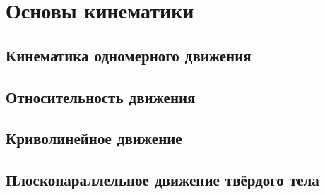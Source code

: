 \chapter{Основы кинематики}

\section{Кинематика одномерного движения}


\section{Относительность движения}


\section{Криволинейное движение}


\section{Плоскопараллельное движение твёрдого тела}


